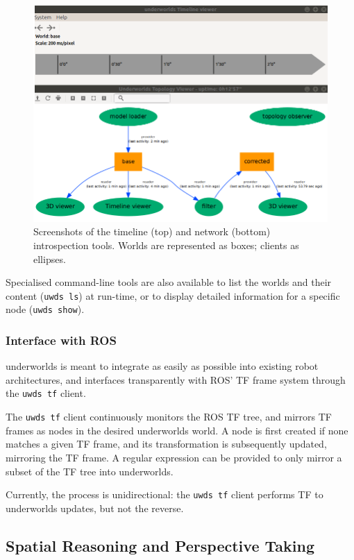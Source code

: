 \documentclass[letterpaper, 10pt, conference]{ieeeconf}
\newcommand{\uwds}{{\sc underworlds}\xspace}
\begin{document}
\begin{figure}
    \centering
    \includegraphics[width=\linewidth]{tools}
    \caption{Screenshots of the timeline (top) and network (bottom)
    introspection tools. Worlds are represented as boxes; clients as ellipses.}
    \label{fig|explorer}
\end{figure}

Specialised command-line tools are also available to list the worlds
and their content ({\tt uwds ls}) at run-time, or to display detailed information for a
specific node ({\tt uwds show}).

\subsubsection{Interface with ROS}

\uwds is meant to integrate as easily as possible into existing robot
architectures, and interfaces transparently with ROS' TF frame system through
the {\tt uwds tf} client.

The {\tt uwds tf} client continuously monitors the ROS TF tree, and mirrors
TF frames as nodes in the desired \uwds world. A node is first created if none
matches a given TF frame, and its transformation is subsequently updated,
mirroring the TF frame. A regular expression can be provided to only mirror a
subset of the TF tree into \uwds.

Currently, the process is unidirectional: the {\tt uwds tf} client performs TF
to \uwds updates, but not the reverse.

\subsection{Spatial Reasoning and Perspective Taking}
\end{document}
